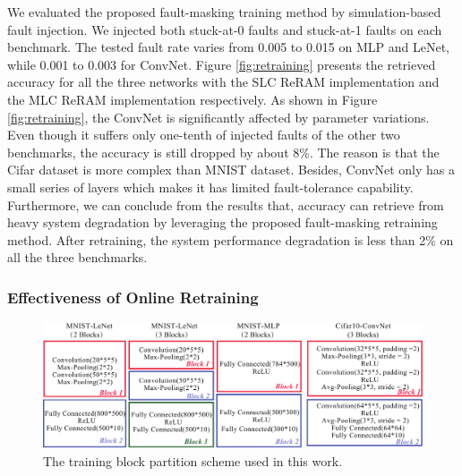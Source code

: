 We evaluated the proposed fault-masking training method by simulation-based fault injection. We injected both stuck-at-0 faults and stuck-at-1 faults on each benchmark. The tested fault rate varies from 0.005 to 0.015 on MLP and LeNet, while 0.001 to 0.003 for ConvNet. Figure \ref{fig:retraining} presents the retrieved accuracy for all the three networks with the SLC ReRAM implementation and the MLC ReRAM implementation respectively. As shown in Figure \ref{fig:retraining}, the ConvNet is significantly affected by parameter variations. Even though it suffers only one-tenth of injected faults of the other two benchmarks, the accuracy is still dropped by about 8\%. The reason is that the Cifar dataset is more complex than MNIST dataset. Besides, ConvNet only has a small series of layers which makes it has limited fault-tolerance capability. Furthermore, we can conclude from the results that, accuracy can retrieve from heavy system degradation by leveraging the proposed fault-masking retraining method. After retraining, the system performance degradation is less than 2\% on all the three benchmarks.


\subsubsection{Effectiveness of Online Retraining}

\begin{figure}
    \centering
    \includegraphics[width=\linewidth]{images/OL-fig16}
    \caption{ The training block partition scheme used in this work. }
    \label{fig:blockpartition}
\end{figure} 

